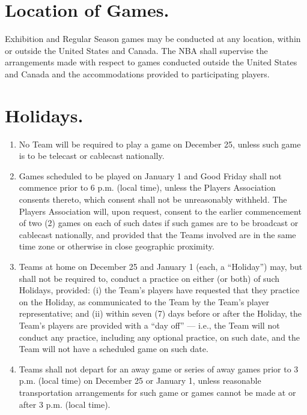 \documentclass[
]{book}
\providecommand{\tightlist}{%
  \setlength{\itemsep}{0pt}\setlength{\parskip}{0pt}}
\begin{document}
\hypertarget{location-of-games.}{%
\section{Location of Games.}\label{location-of-games.}}

Exhibition and Regular Season games may be conducted at any location, within or outside the United States and Canada. The NBA shall supervise the arrangements made with respect to games conducted outside the United States and Canada and the accommodations provided to participating players.

\hypertarget{holidays.}{%
\section{Holidays.}\label{holidays.}}

\begin{enumerate}
\def\labelenumi{(\alph{enumi})}
\tightlist
\item
  No Team will be required to play a game on December 25, unless such game is to be telecast or cablecast nationally.
\item
  Games scheduled to be played on January 1 and Good Friday shall not commence prior to 6 p.m. (local time), unless the Players Association consents thereto, which consent shall not be unreasonably withheld. The Players Association will, upon request, consent to the earlier commencement of two (2) games on each of such dates if such games are to be broadcast or cablecast nationally, and provided that the Teams involved are in the same time zone or otherwise in close geographic proximity.
\item
  Teams at home on December 25 and January 1 (each, a ``Holiday'') may, but shall not be required to, conduct a practice on either (or both) of such Holidays, provided: (i) the Team's players have requested that they practice on the Holiday, as communicated to the Team by the Team's player representative; and (ii) within seven (7) days before or after the Holiday, the Team's players are provided with a ``day off'' --- i.e., the Team will not conduct any practice, including any optional practice, on such date, and the Team will not have a scheduled game on such date.
\item
  Teams shall not depart for an away game or series of away games prior to 3 p.m. (local time) on December 25 or January 1, unless reasonable transportation arrangements for such game or games cannot be made at or after 3 p.m. (local time).
\end{enumerate}
\end{document}
